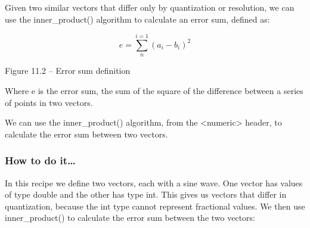 
Given two similar vectors that differ only by quantization or resolution, we can use the inner\_product() algorithm to calculate an error sum, defined as:

\begin{equation*}
e=\sum_{n}^{i=1}(a_i-b_i)^2
\end{equation*}

\begin{center}
Figure 11.2 – Error sum definition
\end{center}

Where e is the error sum, the sum of the square of the difference between a series of points in two vectors.

We can use the inner\_product() algorithm, from the <numeric> header, to calculate the error sum between two vectors.

\subsubsection{How to do it…}

In this recipe we define two vectors, each with a sine wave. One vector has values of type double and the other has type int. This gives us vectors that differ in quantization, because the int type cannot represent fractional values. We then use inner\_product() to calculate the error sum between the two vectors:

